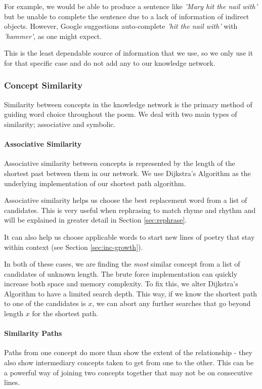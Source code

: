 For example, we would be able to produce a sentence like \textit{'Mary hit the nail with'} but be unable to complete the sentence due to a lack of information of indirect objects. However, Google suggestions auto-complete \textit{'hit the nail with'} with \textit{'hammer'}, as one might expect. 

This is the least dependable source of information that we use, so we only use it for that specific case and do not add any to our knowledge network.


\subsubsection{Concept Similarity}
Similarity between concepts in the knowledge network is the primary method of guiding word choice throughout the poem. We deal with two main types of similarity; associative and symbolic.

\paragraph{Associative Similarity}
\label{sec:assoc-sim}
Associative similarity between concepts is represented by the length of the shortest past between them in our network. We use Dijkstra's Algorithm\cite{dijkstra1959note} as the underlying implementation of our shortest path algorithm.

Associative similarity helps us choose the best replacement word from a list of candidates. This is very useful when rephrasing to match rhyme and rhythm and will be explained in greater detail in Section \ref{sec:rephrase}. 

It can also help us choose applicable words to start new lines of poetry that stay within context (see Section \ref{sec:inc-growth}).

In both of these cases, we are finding the \textit{most} similar concept from a list of candidates of unknown length. The brute force implementation can quickly increase both space and memory complexity. To fix this, we alter Dijkstra's Algorithm to have a limited search depth. This way, if we know the shortest path to one of the candidates is $x$, we can abort any further searches that go beyond length $x$ for the shortest path.

\paragraph{Similarity Paths}
Paths from one concept do more than show the extent of the relationship - they also show intermediary concepts taken to get from one to the other. This can be a powerful way of joining two concepts together that may not be on consecutive lines.

